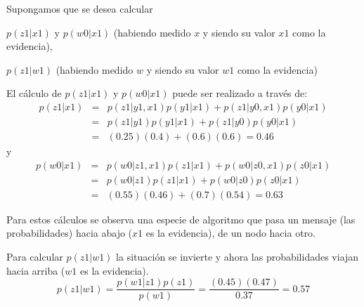 \documentclass{article}
\begin{document}
Supongamos que se desea calcular 
\begin{enumerate*}[label=(\alph*)]
	\item $p(z1 | x1)$ y $p(w0 | x1)$ (habiendo medido $x$ y siendo su valor $x1$ como la evidencia), 
	\item $p(z1 | w1)$ (habiendo medido $w$ y siendo su valor $w1$ como la evidencia)
\end{enumerate*}

El cálculo de $p(z1 | x1)$ y $p(w0 | x1)$ puede ser realizado a través de:
\begin{eqnarray}
	p(z1 | x1) 	&=& p(z1 | y1,x1) p(y1|x1) + p(z1 | y0,x1) p(y0 | x1) \\
				&=& p(z1 | y1) p(y1|x1) + p(z1 | y0) p(y0 | x1) \\
				&=& (0.25)(0.4) + (0.6)(0.6) = 0.46 
\end{eqnarray}
y
\begin{eqnarray}
	p(w0 | x1) 	&=& p(w0 | z1,x1) p(z1|x1) + p(w0 | z0,x1) p(z0 | x1) \\
				&=& p(w0 | z1) p(z1|x1) + p(w0 | z0) p(z0 | x1) \\
				&=& (0.55)(0.46) + (0.7)(0.54) = 0.63
\end{eqnarray}

Para estos cálculos se observa una especie de algoritmo que pasa un mensaje (las probabilidades) hacia abajo ($x1$ es la evidencia), de un nodo hacia otro.

Para calcular $p(z1 | w1)$ la situación se invierte y ahora las probabilidades viajan hacia arriba ($w1$ es la evidencia).
\begin{equation}
	p(z1|w1) = \frac{p(w1|z1)p(z1)}{p(w1)} = \frac{(0.45)(0.47)}{0.37} = 0.57
\end{equation}
\end{document}
